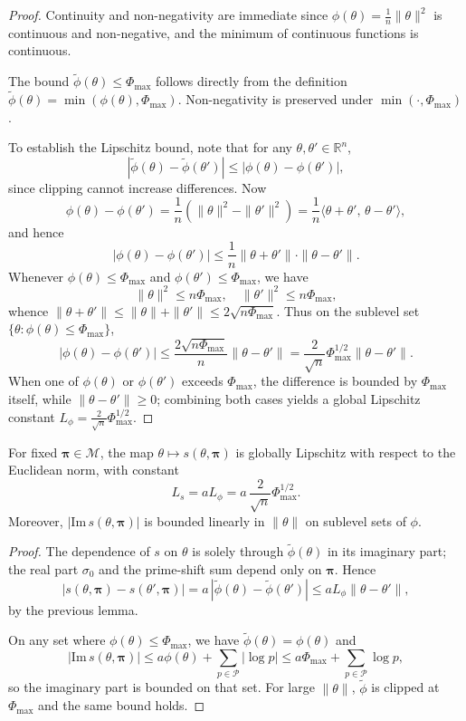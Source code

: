 \documentclass[11pt]{article}
\begin{document}
\begin{proof}
Continuity and non-negativity are immediate since $\phi(\theta)=\frac{1}{n}\|\theta\|^2$ is continuous and non-negative, and the minimum of continuous functions is continuous.

The bound $\tilde{\phi}(\theta)\le\Phi_{\max}$ follows directly from the definition $\tilde{\phi}(\theta) = \min(\phi(\theta),\Phi_{\max})$. Non-negativity is preserved under $\min(\cdot,\Phi_{\max})$.

To establish the Lipschitz bound, note that for any $\theta,\theta'\in\mathbb{R}^n$,
\[
  |\tilde{\phi}(\theta) - \tilde{\phi}(\theta')|
  \le |\phi(\theta) - \phi(\theta')|,
\]
since clipping cannot increase differences. Now
\[
  \phi(\theta) - \phi(\theta')
  = \frac{1}{n}(\|\theta\|^2 - \|\theta'\|^2)
  = \frac{1}{n}\langle \theta+\theta',\,\theta-\theta'\rangle,
\]
and hence
\[
  |\phi(\theta) - \phi(\theta')|
  \le \frac{1}{n}\|\theta+\theta'\|\cdot\|\theta-\theta'\|.
\]
Whenever $\phi(\theta)\le\Phi_{\max}$ and $\phi(\theta')\le\Phi_{\max}$, we have
\[
  \|\theta\|^2 \le n\Phi_{\max},\quad \|\theta'\|^2 \le n\Phi_{\max},
\]
whence $\|\theta+\theta'\|\le \|\theta\|+\|\theta'\| \le 2\sqrt{n\Phi_{\max}}$. Thus on the sublevel set $\{\theta:\phi(\theta)\le\Phi_{\max}\}$,
\[
  |\phi(\theta) - \phi(\theta')|
  \le \frac{2\sqrt{n\Phi_{\max}}}{n}\|\theta-\theta'\|
  = \frac{2}{\sqrt{n}}\Phi_{\max}^{1/2}\|\theta-\theta'\|.
\]
When one of $\phi(\theta)$ or $\phi(\theta')$ exceeds $\Phi_{\max}$, the difference is bounded by $\Phi_{\max}$ itself, while $\|\theta-\theta'\|\ge 0$; combining both cases yields a global Lipschitz constant $L_\phi = \frac{2}{\sqrt{n}}\Phi_{\max}^{1/2}$.
\end{proof}

\begin{lemma}
For fixed $\bm{\pi}\in\mathcal{M}$, the map $\theta\mapsto s(\theta,\bm{\pi})$ is globally Lipschitz with respect to the Euclidean norm, with constant
\[
  L_s = a L_\phi = a\,\frac{2}{\sqrt{n}}\Phi_{\max}^{1/2}.
\]
Moreover, $|\mathrm{Im}\,s(\theta,\bm{\pi})|$ is bounded linearly in $\|\theta\|$ on sublevel sets of $\phi$.
\end{lemma}

\begin{proof}
The dependence of $s$ on $\theta$ is solely through $\tilde{\phi}(\theta)$ in its imaginary part; the real part $\sigma_0$ and the prime-shift sum depend only on $\bm{\pi}$. Hence
\[
  |s(\theta,\bm{\pi}) - s(\theta',\bm{\pi})|
  = a\,|\tilde{\phi}(\theta)-\tilde{\phi}(\theta')|
  \le a L_\phi \|\theta-\theta'\|,
\]
by the previous lemma.

On any set where $\phi(\theta)\le\Phi_{\max}$, we have $\tilde{\phi}(\theta)=\phi(\theta)$ and
\[
  |\mathrm{Im}\,s(\theta,\bm{\pi})|
  \le a\phi(\theta) + \sum_{p\in\mathcal{P}} |\log p|
  \le a\Phi_{\max} + \sum_{p\in\mathcal{P}} \log p,
\]
so the imaginary part is bounded on that set. For large $\|\theta\|$, $\tilde{\phi}$ is clipped at $\Phi_{\max}$ and the same bound holds.
\end{proof}
\end{document}
